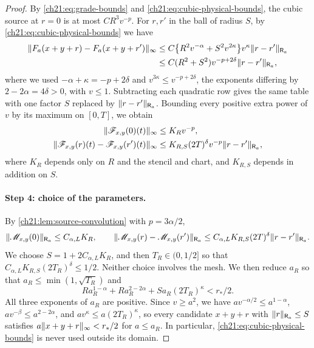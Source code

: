 \begin{proof}
By \eqref{ch21:eq:grade-bounds} and \eqref{ch21:eq:cubic-physical-bounds}, the cubic source at $r=0$ is at most $CR^3v^{-p}$. For $r,r'$ in the ball of radius $S$, by \eqref{ch21:eq:cubic-physical-bounds} we have
\[
 \begin{split}
 \lVert F_a(x+y+r)-F_a(x+y+r')\rVert_\infty
 &\le C\bigl\{R^2v^{-\alpha}+S^2v^{2\kappa}\bigr\}v^\kappa\lVert r-r'\rVert_{\mathsf R_a}\\
 &\le C(R^2+S^2)v^{-p+2\delta}\lVert r-r'\rVert_{\mathsf R_a},
 \end{split}
\]
where we used $-\alpha+\kappa=-p+2\delta$ and $v^{3\kappa}\le v^{-p+2\delta}$, the exponents differing by $2-2\alpha=4\delta>0$, with $v\le1$. Subtracting each quadratic row gives the same table with one factor $S$ replaced by $\lVert r-r'\rVert_{\mathsf R_a}$. Bounding every positive extra power of $v$ by its maximum on $[0,T]$, we obtain
\begin{equation}\label{ch21:eq:source-lipschitz}
 \begin{split}
 \lVert \mathscr F_{x,y}(0)(t)\rVert_\infty&\le K_Rv^{-p},\\
 \lVert \mathscr F_{x,y}(r)(t)-\mathscr F_{x,y}(r')(t)\rVert_\infty&\le K_{R,S}(2T)^\delta v^{-p}\lVert r-r'\rVert_{\mathsf R_a},
 \end{split}
\end{equation}
where $K_R$ depends only on $R$ and the stencil and chart, and $K_{R,S}$ depends in addition on $S$.

\paragraph{Step 4: choice of the parameters.}
By \cref{ch21:lem:source-convolution} with $p=3\alpha/2$,
\[
 \lVert \mathscr M_{x,y}(0)\rVert_{\mathsf R_a}\le C_{\alpha,L}K_R,\qquad
 \lVert \mathscr M_{x,y}(r)-\mathscr M_{x,y}(r')\rVert_{\mathsf R_a}\le C_{\alpha,L}K_{R,S}(2T)^\delta\lVert r-r'\rVert_{\mathsf R_a}.
\]
We choose $S=1+2C_{\alpha,L}K_R$, and then $T_R\in(0,1/2]$ so that $C_{\alpha,L}K_{R,S}(2T_R)^\delta\le1/2$. Neither choice involves the mesh. We then reduce $a_R$ so that $a_R\le\min(1,\sqrt{T_R})$ and
\begin{equation}\label{ch21:eq:reserved-chart}
 Ra_R^{1-\alpha}+Ra_R^{2-2\alpha}+Sa_R(2T_R)^\kappa<r_*/2 .
\end{equation}
All three exponents of $a_R$ are positive. Since $v\ge a^2$, we have $av^{-\alpha/2}\le a^{1-\alpha}$, $av^{-\beta}\le a^{2-2\alpha}$, and $av^\kappa\le a(2T_R)^\kappa$, so every candidate $x+y+r$ with $\lVert r\rVert_{\mathsf R_a}\le S$ satisfies $a\lVert x+y+r\rVert_\infty<r_*/2$ for $a\le a_R$. In particular, \eqref{ch21:eq:cubic-physical-bounds} is never used outside its domain.


\end{proof}
